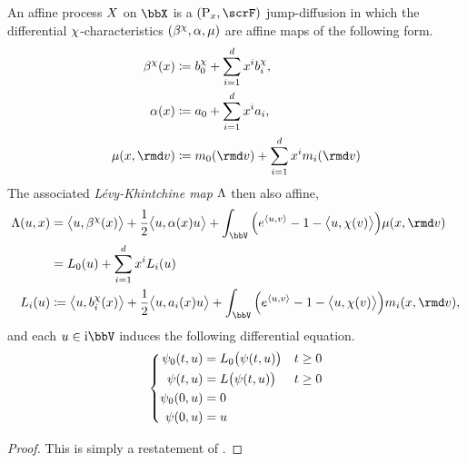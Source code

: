 \begin{theorem}
  \label{theorem:affine-regularity}
  An affine process $X$ on $\stateSpace$ is a $(\Prb_\stateVar, \scrF)$ jump-diffusion in which the differential $\chi$-characteristics $(\beta^\chi, \alpha, \mu)$ are affine maps of the following form.
  \begin{align*}
    \affDrift^\trunc(\stateVar) &\defeq \affDriftPart^\trunc_0 + \sum_{i=1}^d \stateVar^i \affDriftPart^\trunc_i, \\
    \affDiff(\stateVar) &\defeq \affDiffPart_0 + \sum_{i=1}^d \stateVar^i \affDiffPart_i,  \\
    \affJump(\stateVar, \rmd\markVar) &\defeq \affJumpPart_0(\rmd\markVar) + \sum_{i=1}^d \stateVar^i \affJumpPart_i(\rmd\markVar)
  \end{align*}
  The associated \emph{L\'evy-Khintchine map} $\Lambda$ then also affine,
  \begin{align*}
    \ode(\momentVar, \stateVar) 
    &= \bprj{\momentVar}{\affDrift^\trunc(\stateVar)} + \frac12 \bprj{\momentVar}{\affDiff(\stateVar)\momentVar} + \int_\vecSpace \Big( e^\prj{\momentVar}{\markVar} - 1 - \bprj{\momentVar}{\trunc(\markVar)} \Big) \affJump(\stateVar, \rmd\markVar) \\
    &= \odePart_0(\momentVar) + \sum_{i=1}^d \stateVar^i \odePart_i(\momentVar) \\
    \odePart_i(\momentVar)
    &\defeq \bprj{\momentVar}{\affDriftPart_i^\trunc(\stateVar)} + \frac12\bprj{\momentVar}{\affDiffPart_i(\stateVar)\momentVar} + \int_\vecSpace \Big( e^\prj{\momentVar}{\markVar} - 1 - \bprj{\momentVar}{\trunc(\markVar)} \Big) \affJumpPart_i(\stateVar, \rmd\markVar),
  \end{align*}
  and each $\momentVar \in \im\vecSpace$ induces the following differential equation.
  \begin{equation}
    \label{eq:complex-riccati-charts}
    \left\{\begin{aligned}
      \psi_0(t,u) &= L_0\big(\psi(t, u)\big) & t \geq 0 \\
      \psi(t,u) &= L\big(\psi(t,u)\big) & t \geq 0 \\
      \psi_0(0,u) &= 0 \\
      \psi(0, u) &= u
    \end{aligned}\right.
  \end{equation}
\end{theorem}
\begin{proof}
  \label{proof:affine-regularity}
  This is simply a restatement of \cite[Theorem 1.5.4]{cuchiero2011}.
\end{proof}
